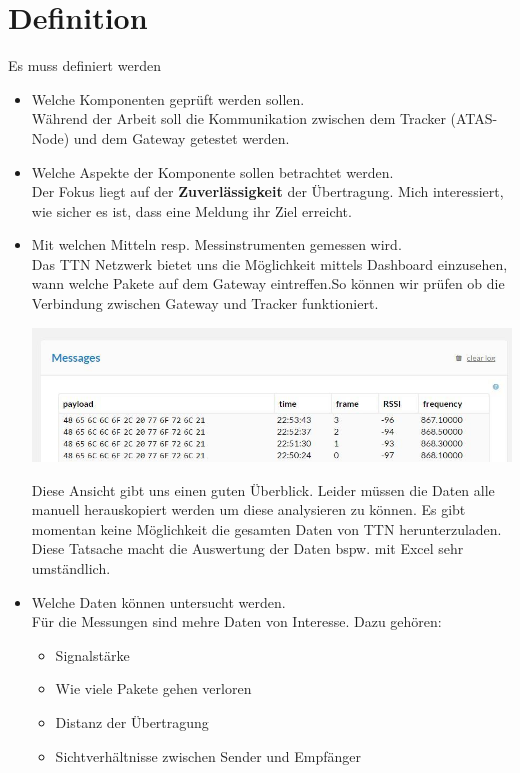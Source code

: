 \documentclass[11pt,english,german]{report}
\theoremstyle{definition}
\begin{document}
\section{Definition}
Es muss definiert werden
\begin{itemize}
	\item Welche Komponenten geprüft werden sollen.\\[0.3cm]
	Während der Arbeit soll die Kommunikation zwischen dem Tracker (ATAS-Node) und dem Gateway getestet werden.
	\item Welche Aspekte der Komponente sollen betrachtet werden.\\[0.3cm]
	Der Fokus liegt auf der \textbf{Zuverlässigkeit} der Übertragung. Mich interessiert, wie sicher es ist, dass eine Meldung ihr Ziel erreicht. 
	\item Mit welchen Mitteln resp. Messinstrumenten gemessen wird.\\[0.3cm]	
	Das TTN Netzwerk bietet uns die Möglichkeit mittels Dashboard einzusehen, wann welche Pakete auf dem Gateway eintreffen.So können wir prüfen ob die Verbindung zwischen Gateway und Tracker funktioniert. \\
	
	\begin{minipage}{\linewidth}
		\centering
		\includegraphics[width=\linewidth]{img/ttn/ttn_messages}
	\end{minipage}

	Diese Ansicht gibt uns einen guten Überblick. Leider müssen die Daten alle manuell herauskopiert werden um diese analysieren zu können. Es gibt momentan keine Möglichkeit die gesamten Daten von TTN herunterzuladen. Diese Tatsache macht die Auswertung der Daten bspw. mit Excel sehr umständlich.
	
	\item Welche Daten können untersucht werden.\\[0.3cm]
	Für die Messungen sind mehre Daten von Interesse. Dazu gehören: 
	\begin{itemize}
		\item Signalstärke
		\item Wie viele Pakete gehen verloren
		\item Distanz der Übertragung
		\item Sichtverhältnisse zwischen Sender und Empfänger
	\end{itemize}
\end{itemize}
\end{document}
